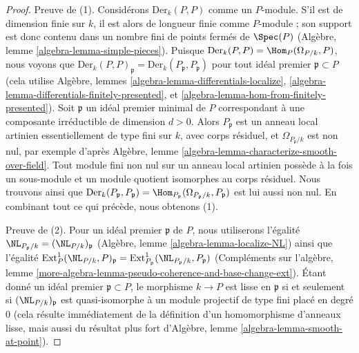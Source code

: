 \begin{proof}
Preuve de (1). Considérons $\text{Der}_k(P, P)$ comme un $P$-module.
S'il est de dimension finie sur $k$, il est alors de longueur finie
comme $P$-module ; son support est donc contenu dans un nombre fini de
points fermés de $\Spec(P)$
(Algèbre, lemme \ref{algebra-lemma-simple-pieces}).
Puisque $\text{Der}_k(P, P) = \Hom_P(\Omega_{P/k}, P)$,
nous voyons que
$\text{Der}_k(P, P)_\mathfrak p = \text{Der}_k(P_\mathfrak p, P_\mathfrak p)$
pour tout idéal premier $\mathfrak p \subset P$
(cela utilise Algèbre, lemmes
\ref{algebra-lemma-differentials-localize},
\ref{algebra-lemma-differentials-finitely-presented}, et
\ref{algebra-lemma-hom-from-finitely-presented}).
Soit $\mathfrak p$ un idéal premier minimal de $P$
correspondant à une composante irréductible de dimension $d > 0$.
Alors $P_\mathfrak p$ est un anneau local artinien
essentiellement de type fini sur $k$, avec corps résiduel,
et $\Omega_{P_\mathfrak p/k}$ est non nul, par exemple d'après
Algèbre, lemme \ref{algebra-lemma-characterize-smooth-over-field}.
Tout module fini non nul sur un anneau local artinien
possède à la fois un sous-module et un module quotient isomorphes au corps résiduel.
Nous trouvons ainsi que
$\text{Der}_k(P_\mathfrak p, P_\mathfrak p) =
\Hom_{P_\mathfrak p}(\Omega_{P_\mathfrak p/k}, P_\mathfrak p)$
est lui aussi non nul. En combinant tout ce qui précède, nous obtenons (1).

\medskip\noindent
Preuve de (2). Pour un idéal premier $\mathfrak p$ de $P$, nous utiliserons l'égalité
$\NL_{P_\mathfrak p/k} = (\NL_{P/k})_\mathfrak p$
(Algèbre, lemme \ref{algebra-lemma-localize-NL})
ainsi que
l'égalité
$\text{Ext}_P^1(\NL_{P/k}, P)_\mathfrak p =
\text{Ext}_{P_\mathfrak p}^1(\NL_{P_\mathfrak p/k}, P_\mathfrak p)$
(Compléments sur l'algèbre, lemme
\ref{more-algebra-lemma-pseudo-coherence-and-base-change-ext}).
Étant donné un idéal premier $\mathfrak p \subset P$,
le morphisme $k \to P$ est lisse en $\mathfrak p$ si et seulement si
$(\NL_{P/k})_\mathfrak p$ est quasi-isomorphe
à un module projectif de type fini placé en degré $0$ (cela résulte
immédiatement de la définition d'un homomorphisme d'anneaux lisse, mais aussi
du résultat plus fort d'Algèbre, lemme \ref{algebra-lemma-smooth-at-point}).


\end{proof}
